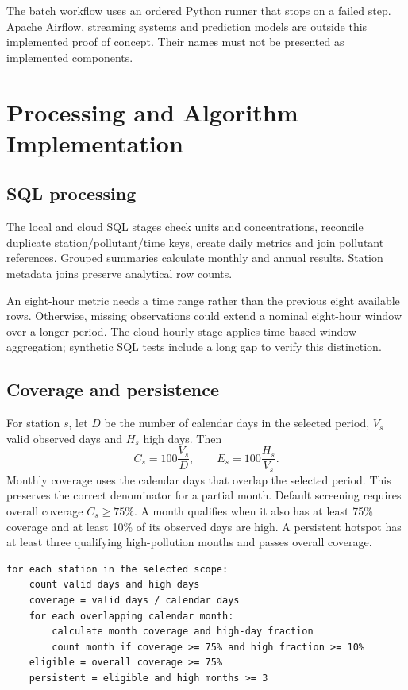 \documentclass[11pt,a4paper]{article}
\begin{document}
The batch workflow uses an ordered Python runner that stops on a failed step. Apache Airflow, streaming systems and prediction models are outside this implemented proof of concept. Their names must not be presented as implemented components.

\newpage
\section{Processing and Algorithm Implementation}
\subsection{SQL processing}
The local and cloud SQL stages check units and concentrations, reconcile duplicate station/pollutant/time keys, create daily metrics and join pollutant references. Grouped summaries calculate monthly and annual results. Station metadata joins preserve analytical row counts.

An eight-hour metric needs a time range rather than the previous eight available rows. Otherwise, missing observations could extend a nominal eight-hour window over a longer period. The cloud hourly stage applies time-based window aggregation; synthetic SQL tests include a long gap to verify this distinction.

\subsection{Coverage and persistence}
For station $s$, let $D$ be the number of calendar days in the selected period, $V_s$ valid observed days and $H_s$ high days. Then
\[
 C_s=100\frac{V_s}{D},\qquad E_s=100\frac{H_s}{V_s}.
\]
Monthly coverage uses the calendar days that overlap the selected period. This preserves the correct denominator for a partial month. Default screening requires overall coverage $C_s\geq75\%$. A month qualifies when it also has at least 75\% coverage and at least 10\% of its observed days are high. A persistent hotspot has at least three qualifying high-pollution months and passes overall coverage.

\begin{lstlisting}
for each station in the selected scope:
    count valid days and high days
    coverage = valid days / calendar days
    for each overlapping calendar month:
        calculate month coverage and high-day fraction
        count month if coverage >= 75% and high fraction >= 10%
    eligible = overall coverage >= 75%
    persistent = eligible and high months >= 3
\end{lstlisting}
\end{document}
